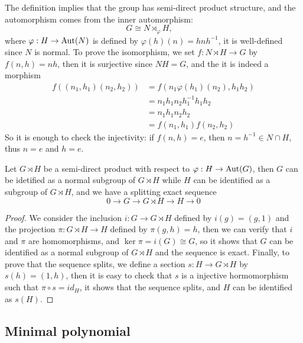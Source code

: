 \begin{remark}
    The definition implies that the group has semi-direct product structure, and the automorphism comes from the inner automorphism:
    \[G \cong N \rtimes_{\varphi} H, \quad\]
    where \(\varphi: H \to \operatorname{Aut}(N)\) is defined by \(\varphi(h)(n) = hnh^{-1}\), it is well-defined since \(N\) is normal. To prove the isomorphism, we set \(f:N \rtimes H \to G\) by \(f(n,h) = nh\), then it is surjective since \(NH = G\), and the it is indeed a morphism
    \begin{align*}
        f((n_1,h_1)(n_2,h_2)) &= f(n_1 \varphi(h_1)(n_2), h_1 h_2)\\
        &= n_1 h_1 n_2 h_1^{-1} h_1 h_2\\
        &= n_1 h_1 n_2 h_2\\
        &= f(n_1,h_1)f(n_2,h_2)
    \end{align*}
    So it is enough to check the injectivity: if \(f(n,h) = e\), then \(n = h^{-1} \in N \cap H\), thus \(n = e\) and \(h = e\).

\end{remark}


\begin{proposition}
    Let \(G \rtimes H\) be a semi-direct product with respect to \(\varphi: H \to \operatorname{Aut}(G)\), then \(G\) can be idetified as  a normal subgroup of \(G \rtimes H\) while \(H\) can be identified as a subgroup of \(G \rtimes H\), and we have a splitting exact sequence
\[0 \to G \to G \rtimes H \to H \to 0\]
\end{proposition}

\begin{proof}
    We consider the inclusion \(i:G \to G \rtimes H\) defined by \(i(g) = (g,1)\) and the projection \(\pi:G \rtimes H \to H\) defined by \(\pi(g,h) = h\), then we can verify  that \(i\) and \(\pi\) are homomorphisms, and \(\ker \pi = i(G) \cong G\), so it shows that \(G\) can be identified as a normal subgroup of \(G \rtimes H\) and the sequence is exact. Finally, to prove that the sequence splits, we define a section \(s:H \to G \rtimes H\) by \(s(h) = (1,h)\), then it is easy to check that \(s\) is a injective hormomorphism such that \(\pi \circ s = id_H\), it shows that the sequence splits, and \(H\) can be identified as \(s(H)\).
\end{proof}





\newpage

\subsection{Minimal polynomial}

